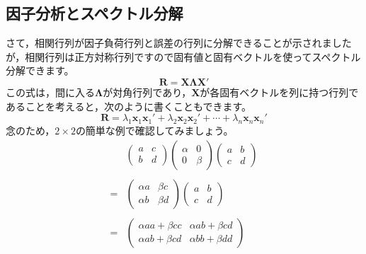 \documentclass{ltjsbook}
\begin{document}
\subsection{因子分析とスペクトル分解}
さて，相関行列が因子負荷行列と誤差の行列に分解できることが示されましたが，相関行列は正方対称行列ですので固有値と固有ベクトルを使ってスペクトル分解できます。
\[ \bm{R} = \bm{X \Lambda X}' \]
この式は，間に入る$\bm{\Lambda}$が対角行列であり，$\bm{X}$が各固有ベクトルを列に持つ行列であることを考えると，次のように書くこともできます。
\[ \bm{R} = \lambda_1\bm{x}_1\bm{x}_1'+\lambda_2\bm{x}_2\bm{x}_2'+\cdots+ \lambda_n\bm{x}_n\bm{x}_n'\]
念のため，$2 \times 2$の簡単な例で確認してみましょう。
\[
	\begin{array}{ll}
		  & \begin{pmatrix} a & c\\ b & d \end{pmatrix}\begin{pmatrix}\alpha & 0\\ 0&\beta \end{pmatrix}\begin{pmatrix}a & b\\ c & d \end{pmatrix} \\
		  &                                                                                                                                        \\
		= & \begin{pmatrix} \alpha a & \beta c \\ \alpha b & \beta d \end{pmatrix}\begin{pmatrix}a & b\\ c & d \end{pmatrix}                       \\
		  &                                                                                                                                        \\
		= & \begin{pmatrix} \alpha aa + \beta cc & \alpha ab + \beta cd \\
                \alpha ab + \beta cd & \alpha bb + \beta dd\end{pmatrix}                                                                            \\
		  &                                                                                                                                        \\

\end{array}\]
\end{document}
